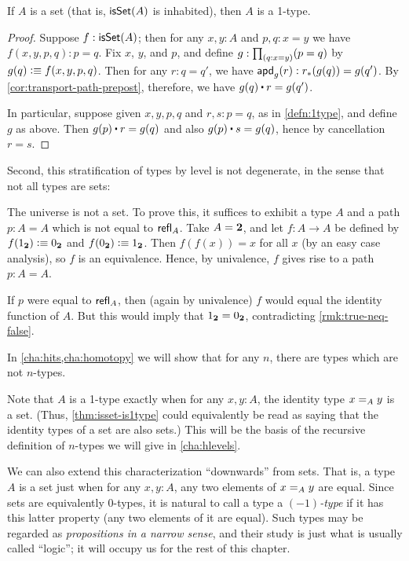 \begin{lem}\label{thm:isset-is1type}
  If $A$ is a set (that is, $\isset(A)$ is inhabited), then $A$ is a 1-type.
\end{lem}
\begin{proof}
  Suppose $f:\isset(A)$; then for any $x,y:A$ and $p,q:x=y$ we have $f(x,y,p,q):p=q$.
  Fix $x$, $y$, and $p$, and define $g: \prd{q:x=y} (p=q)$ by $g(q) \defeq f (x,y,p,q)$.
  Then for any $r:q=q'$, we have $\apdfunc{g}(r) : \trans{r}{g(q)} = g(q')$.
  By \autoref{cor:transport-path-prepost}, therefore, we have $g(q) \ct r = g(q')$.

  In particular, suppose given $x,y,p,q$ and $r,s:p=q$, as in \autoref{defn:1type}, and define $g$ as above.
  Then $g(p) \ct r = g(q)$ and also $g(p) \ct s = g(q)$, hence by cancellation $r=s$.
\end{proof}

Second, this stratification of types by level is not degenerate, in the
sense that not all types are sets:  

\begin{eg}\label{thm:type-is-not-a-set}
  The universe \type is not a set.
  To prove this, it suffices to exhibit a type $A$ and a path $p:A=A$ which is not equal to $\refl A$.
  Take $A=\bool$, and let $f:A\to A$ be defined by $f(\btrue)\defeq \bfalse$ and $f(\bfalse)\defeq \btrue$.
  Then $f(f(x))=x$ for all $x$ (by an easy case analysis), so $f$ is an equivalence.
  Hence, by univalence, $f$ gives rise to a path $p:A=A$.

  If $p$ were equal to $\refl A$, then (again by univalence) $f$ would equal the identity function of $A$.
  But this would imply that $\btrue=\bfalse$, contradicting \autoref{rmk:true-neq-false}.
\end{eg}

In \autoref{cha:hits,cha:homotopy} we will show that for any $n$, there are types which are not $n$-types.

Note that $A$ is a 1-type exactly when for any $x,y:A$, the identity type $\id[A]xy$ is a set.
(Thus, \autoref{thm:isset-is1type} could equivalently be read as saying that the identity types of a set are also sets.)
This will be the basis of the recursive definition of $n$-types we will give in \autoref{cha:hlevels}.

We can also extend this characterization ``downwards'' from sets.
That is, a type $A$ is a set just when for any $x,y:A$, any two elements of $\id[A]xy$ are equal.
Since sets are equivalently 0-types, it is natural to call a type a \emph{$(-1)$-type} if it has this latter property (any two elements of it are equal).
Such types may be regarded as \emph{propositions in a narrow sense}, and their study is just what is usually called ``logic''; it will occupy us for the rest of this chapter.

